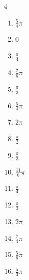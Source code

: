 \begin{multicols}{4}
\begin{enumerate}
  \item $\displaystyle \frac{5}{4}\pi$

  \item $\displaystyle 0$

  \item $\displaystyle \frac{\pi}{4}$

  \item $\displaystyle \frac{7}{6}\pi$

  \item $\displaystyle \frac{\pi}{3}$

  \item $\displaystyle \frac{5}{4}\pi$

  \item $\displaystyle 2\pi$

  \item $\displaystyle \frac{\pi}{2}$

  \item $\displaystyle \frac{\pi}{3}$

  \item $\displaystyle \frac{11}{6}\pi$

  \item $\displaystyle \frac{\pi}{4}$

  \item $\displaystyle \frac{\pi}{3}$

  \item $\displaystyle 2\pi$

\columnbreak %

  \item $\displaystyle \frac{7}{4}\pi$

  \item $\displaystyle \frac{5}{6}\pi$

  \item $\displaystyle \frac{5}{3}\pi$


\end{enumerate}
\end{multicols}
